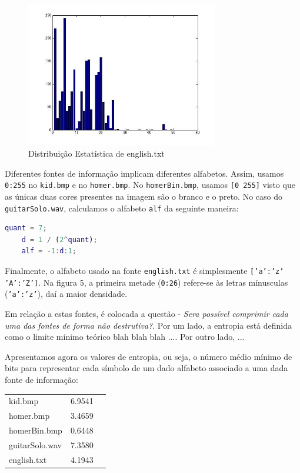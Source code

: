 \documentclass[12pt]{article}
\begin{document}
  \begin{figure}[H]
    \centering
      \includegraphics[width=0.75\textwidth]{ex3english}
    \caption{Distribuição Estatística de english.txt}
  \end{figure}

  Diferentes fontes de informação implicam diferentes alfabetos. Assim, usamos
  \texttt{0:255} no \texttt{kid.bmp} e no \texttt{homer.bmp}. No \texttt{homerBin.bmp},
  usamos \texttt{[0 255]} visto que as únicas duas cores presentes na imagem
  são o branco e o preto. No caso do \texttt{guitarSolo.wav}, calculamos o alfabeto
  \texttt{alf} da seguinte maneira:

  \vspace{2mm}
  \begin{lstlisting}[language=Matlab]
    quant = 7;
    d = 1 / (2^quant);
    alf = -1:d:1;
  \end{lstlisting}

  Finalmente, o alfabeto usado na fonte \texttt{english.txt} é simplesmente
  \texttt{['a':'z' 'A':'Z']}. Na figura 5, a primeira metade (\texttt{0:26})
  refere-se às letras mínusculas (\texttt{'a':'z'}), daí a maior densidade.

  Em relação a estas fontes, é colocada a questão - \textit{Sera possível
  comprimir cada uma das fontes de forma não destrutiva?}. Por um lado, a entropia
  está definida como o limite mínimo teórico blah blah blah .... Por outro lado, ...


  Apresentamos agora os valores de entropia, ou seja, o número médio mínimo
  de bits para representar cada símbolo de um dado alfabeto associado a uma
  dada fonte de informação:

  \begin{tabular}{ l c r }
    kid.bmp & 6.9541 \\
    homer.bmp & 3.4659 \\
    homerBin.bmp & 0.6448 \\
    guitarSolo.wav & 7.3580 \\
    english.txt & 4.1943 \\
  \end{tabular}
\end{document}
